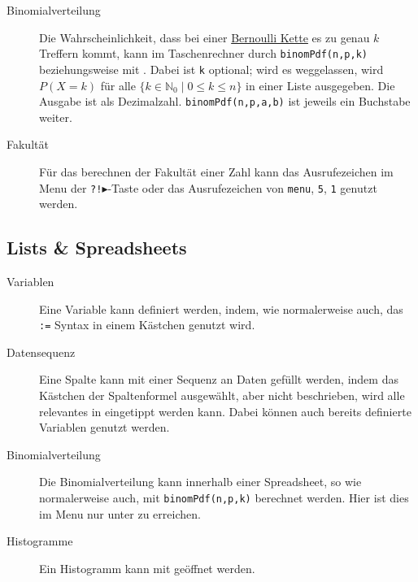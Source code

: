 \documentclass{article}
\begin{document}
\begin{description}
 \item[Binomialverteilung] Die Wahrscheinlichkeit, dass bei einer \hyperref[Bernoulli Ketten]{Bernoulli Kette} es zu genau $k$ Treffern kommt, kann im Taschenrechner durch \texttt{binomPdf(n,p,k)} beziehungsweise mit  \arrow {} \arrow {} \arrow {}. Dabei ist \texttt{k} optional; wird es weggelassen, wird $P(X=k)$ für alle $\{k \in \mathbb{N}_0 \mid 0 \leq k \leq n\}$ in einer Liste ausgegeben. Die Ausgabe ist als Dezimalzahl. \texttt{binomPdf(n,p,a,b)} ist jeweils ein Buchstabe weiter. 
 \item[Fakultät] Für das berechnen der Fakultät einer Zahl kann das Ausrufezeichen im Menu der \texttt{?!$\blacktriangleright$}-Taste oder das Ausrufezeichen von \texttt{menu}, \texttt{5}, \texttt{1} genutzt werden.  
\end{description} 
 
\subsection{Lists \& Spreadsheets}
\begin{description}
 \item[Variablen] Eine Variable kann definiert werden, indem, wie normalerweise auch, das \texttt{:=} Syntax in einem Kästchen genutzt wird. 
 \item[Datensequenz] Eine Spalte kann mit einer Sequenz an Daten gefüllt werden, indem das Kästchen der Spaltenformel ausgewählt, aber nicht beschrieben, wird alle relevantes in  \arrow {} \arrow {} eingetippt werden kann. Dabei können auch bereits definierte Variablen genutzt werden.
 \item[Binomialverteilung] Die Binomialverteilung kann innerhalb einer Spreadsheet, so wie normalerweise auch, mit \texttt{binomPdf(n,p,k)} berechnet werden. Hier ist dies im Menu nur unter  \arrow {} \arrow {} \arrow {} zu erreichen.
 \item[Histogramme] Ein Histogramm kann mit  \arrow {} \arrow {} geöffnet werden.
\end{description}  
\end{document}
